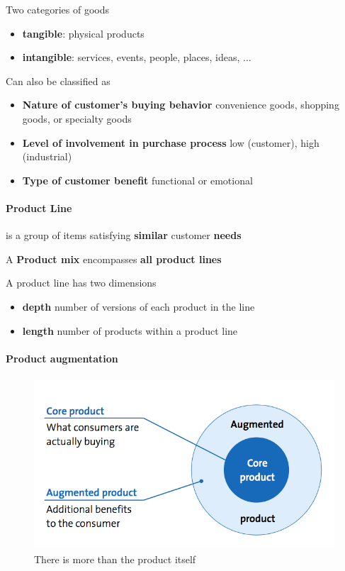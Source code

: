 \documentclass[a4paper,titlepage] {scrartcl}
\begin{document}
Two categories of goods
\begin{itemize}
	\item \textbf{tangible}: physical products
	\item \textbf{intangible}: services, events, people, places, ideas, ...
\end{itemize}

Can also be classified as
\begin{itemize}
	\item \textbf{Nature of customer's buying behavior} convenience goods, shopping goods, or specialty goods
	\item \textbf{Level of involvement in purchase process} low (customer), high (industrial)
	\item \textbf{Type of customer benefit} functional or emotional
\end{itemize}

\paragraph{Product Line} %
\label{par:product_line}
is a group of items satisfying \textbf{similar} customer \textbf{needs}

A \textbf{Product mix} encompasses \textbf{all product lines}

A product line has two dimensions
\begin{itemize}
	\item \textbf{depth} number of versions of each product in the line
	\item \textbf{length} number of products within a product line
\end{itemize}

\paragraph{Product augmentation} %
\label{par:product_augmentation}
\begin{figure}[htbp]
	\centering
		\includegraphics[height=2.5in]{images/morethanproduct.png}
	\caption{There is more than the product itself}
	\label{fig:images_morethanproduct}
\end{figure}
\end{document}
